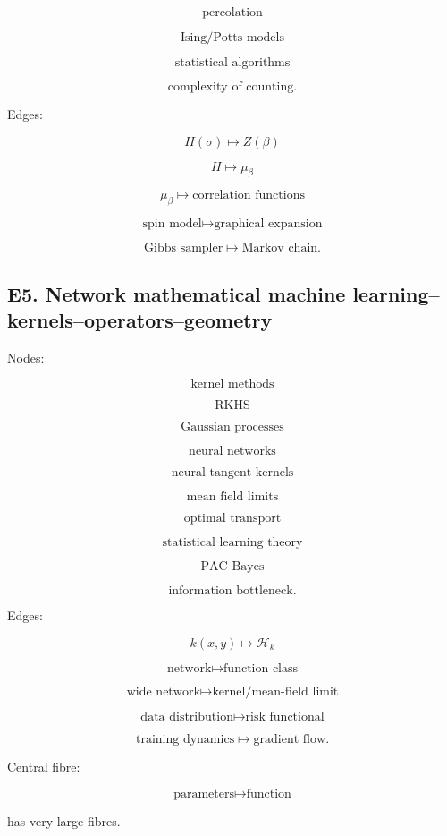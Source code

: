 \documentclass[11pt]{article}
\begin{document}
\[
\text{percolation}
\]

\[
\text{Ising/Potts models}
\]

\[
\text{statistical algorithms}
\]

\[
\text{complexity of counting}.
\]

Edges:

\[
H(\sigma)\mapsto Z(\beta)
\]

\[
H\mapsto \mu_\beta
\]

\[
\mu_\beta\mapsto \text{correlation functions}
\]

\[
\text{spin model}\mapsto \text{graphical expansion}
\]

\[
\text{Gibbs sampler}\mapsto \text{Markov chain}.
\]



\subsection{E5. Network mathematical machine learning--kernels--operators--geometry}

Nodes:

\[
\text{kernel methods}
\]

\[
\text{RKHS}
\]

\[
\text{Gaussian processes}
\]

\[
\text{neural networks}
\]

\[
\text{neural tangent kernels}
\]

\[
\text{mean field limits}
\]

\[
\text{optimal transport}
\]

\[
\text{statistical learning theory}
\]

\[
\text{PAC-Bayes}
\]

\[
\text{information bottleneck}.
\]

Edges:

\[
k(x,y)\mapsto \mathcal H_k
\]

\[
\text{network}\mapsto \text{function class}
\]

\[
\text{wide network}\mapsto \text{kernel/mean-field limit}
\]

\[
\text{data distribution}\mapsto \text{risk functional}
\]

\[
\text{training dynamics}\mapsto \text{gradient flow}.
\]

Central fibre:

\[
\text{parameters}\mapsto \text{function}
\]

has very large fibres.
\end{document}
